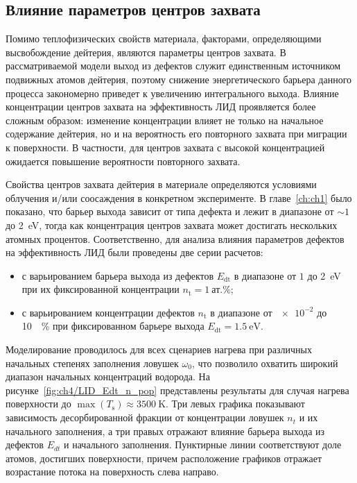\subsection{Влияние параметров центров захвата}\label{subsec:ch4/sec3/subsec2}

Помимо теплофизических свойств материала, факторами, определяющими высвобождение дейтерия, являются параметры центров захвата. В рассматриваемой модели выход из дефектов служит единственным источником подвижных атомов дейтерия, поэтому снижение энергетического барьера данного процесса закономерно приведет к увеличению интегрального выхода. Влияние концентрации центров захвата на эффективность ЛИД проявляется более сложным образом: изменение концентрации влияет не только на начальное содержание дейтерия, но и на вероятность его повторного захвата при миграции к поверхности. В частности, для центров захвата с высокой концентрацией ожидается повышение вероятности повторного захвата.

Свойства центров захвата дейтерия в материале определяются условиями облучения и/или соосаждения в конкретном эксперименте. В главе~\cref{ch:ch1} было показано, что барьер выхода зависит от типа дефекта и лежит в диапазоне от \(\sim\num{1}\) до \SI{2}{\electronvolt}, тогда как концентрация центров захвата может достигать нескольких атомных процентов. Соответственно, для анализа влияния параметров дефектов на эффективность ЛИД были проведены две серии расчетов:
\begin{itemize}
    \item с варьированием барьера выхода из дефектов \(E_\mathrm{dt}\) в диапазоне от \(\num{1}\) до \SI{2}{\electronvolt} при их фиксированной концентрации \( n_\mathrm{t}=\SI{1}{\text{ат.}\percent}\);
    \item с варьированием концентрации дефектов \(n_\mathrm{t}\) в диапазоне от \(\num{e-2}\) до \SI{10}{\percent} при фиксированном барьере выхода \( E_\mathrm{dt}=\SI{1.5}{\electronvolt}\).
\end{itemize}

Моделирование проводилось для всех сценариев нагрева при различных начальных степенях заполнения ловушек $\omega_0$, что позволило охватить широкий диапазон начальных концентраций водорода. На рисунке~\cref{fig:ch4/LID_Edt_n_pop} представлены результаты для случая нагрева поверхности до $\max(T_\mathrm{s}) \approx \SI{3500}{\kelvin}$. Три левых графика показывают зависимость десорбированной фракции от концентрации ловушек $n_{t}$ и их начального заполнения, а три правых отражают влияние барьера выхода из дефектов $E_{dt}$ и начального заполнения. Пунктирные линии соответствуют доле атомов, достигших поверхности, причем расположение графиков отражает возрастание потока на поверхность слева направо.

